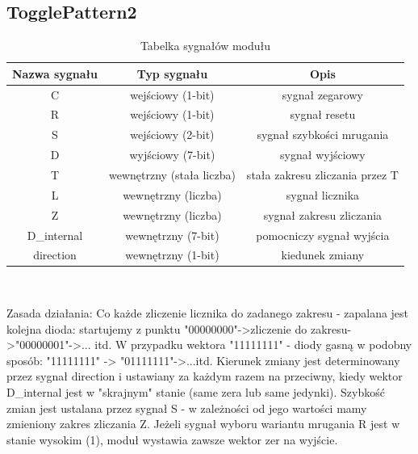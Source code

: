 \documentclass{article}
\begin{document}
\subsection{TogglePattern2}
\begin{table}[H]
    \centering
    \begin{tabular}{|c|c|c|}
        \hline
        Nazwa sygnału & Typ sygnału & Opis \\
        \hline
        C  & wejściowy (1-bit)    & sygnał zegarowy    \\
        \hline
        R  & wejściowy (1-bit)   & sygnał resetu   \\
        \hline
        S  & wejściowy (2-bit)    & sygnał szybkości mrugania\\
        \hline
        D  & wyjściowy (7-bit)    & sygnał wyjściowy\\
        \hline
        T  & wewnętrzny (stała liczba) & stała zakresu zliczania przez T  \\
        \hline
        L  & wewnętrzny (liczba) & sygnał licznika \\
        \hline
        Z  & wewnętrzny (liczba) & sygnał zakresu zliczania \\
        \hline
        D\_internal  & wewnętrzny (7-bit) & pomocniczy sygnał wyjścia  \\
        \hline
        direction  & wewnętrzny (1-bit) & kiedunek zmiany \\
        \hline
    \end{tabular}\\
    \caption{Tabelka sygnałów modułu}
    \label{tab:tabela5}
\end{table}
Zasada działania: Co każde zliczenie licznika do zadanego zakresu - zapalana jest kolejna dioda: startujemy z punktu "00000000"->zliczenie do zakresu->"00000001"->... itd.
W przypadku wektora "11111111" - diody gasną w podobny sposób: "11111111" -> "01111111"->...itd. Kierunek zmiany jest determinowany przez sygnał direction i ustawiany za każdym razem na przeciwny, kiedy
wektor D\_internal jest w "skrajnym" stanie (same zera lub same jedynki). Szybkość zmian jest ustalana przez sygnał S - w zależności od jego
wartości mamy zmieniony zakres zliczania Z. Jeżeli sygnał wyboru wariantu mrugania R jest w stanie wysokim (1), moduł wystawia zawsze wektor zer na wyjście.
\end{document}
